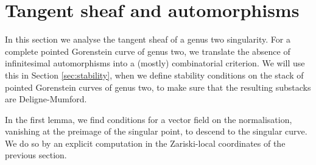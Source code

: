 \documentclass{compositio}
\theoremstyle{plain}
\theoremstyle{definition}
\theoremstyle{remark}
\begin{document}
\section{Tangent sheaf and automorphisms}\label{sec:crimp}
In this section we analyse the tangent sheaf of a genus two singularity. For a complete pointed Gorenstein curve of genus two, we translate the absence of infinitesimal automorphisms into a (mostly) combinatorial criterion. We will use this in Section \ref{sec:stability}, when we define stability conditions on the stack of pointed Gorenstein curves of genus two, to make sure that the resulting substacks are Deligne-Mumford.

In the first lemma, we find conditions for a vector field on the normalisation, vanishing at the preimage of the singular point, to descend to the singular curve. We do so by an explicit computation in the Zariski-local coordinates of the previous section.
\end{document}
